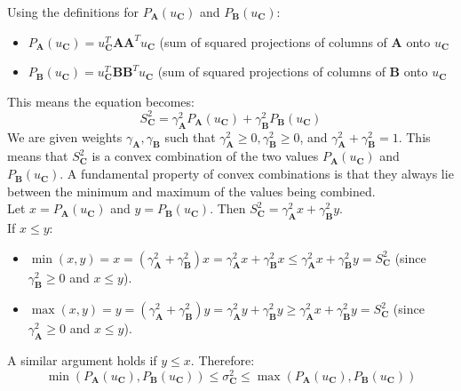 Using the definitions for $P_{\mathbf{A}}(u_{\mathbf{C}})$ and $P_{\mathbf{B}}(u_{\mathbf{C}})$:
\begin{itemize}
    \item $P_{\mathbf{A}}(u_{\mathbf{C}}) = u_{\mathbf{C}}^T\mathbf{A}\mathbf{A}^Tu_{\mathbf{C}}$ (sum of squared projections of columns of $\mathbf{A}$ onto $u_{\mathbf{C}}$
    \item $P_{\mathbf{B}}(u_{\mathbf{C}}) = u_{\mathbf{C}}^T\mathbf{B}\mathbf{B}^Tu_{\mathbf{C}}$ (sum of squared projections of columns of $\mathbf{B}$ onto $u_{\mathbf{C}}$
\end{itemize}
This means the equation becomes:
\[ S_{\mathbf{C}}^2 = \gamma_{\mathbf{A}}^2P_{\mathbf{A}}(u_{\mathbf{C}}) + \gamma_{\mathbf{B}}^2P_{\mathbf{B}}(u_{\mathbf{C}}) \]
We are given weights $\gamma_{\mathbf{A}}, \gamma_{\mathbf{B}}$ such that $\gamma_{\mathbf{A}}^2 \geq 0,
\gamma_{\mathbf{B}}^2 \geq 0$, and $\gamma_{\mathbf{A}}^2 + \gamma_{\mathbf{B}}^2 = 1$. This means that
$S_{\mathbf{C}}^2$ is a convex combination of the two values $P_{\mathbf{A}}(u_{\mathbf{C}})$ and
$P_{\mathbf{B}}(u_{\mathbf{C}})$.
A fundamental property of convex combinations is that they always lie between
the minimum and maximum of the values being combined.\\
Let $x = P_{\mathbf{A}}(u_{\mathbf{C}})$ and $y = P_{\mathbf{B}}(u_{\mathbf{C}})$. Then $S_{\mathbf{C}}^2 = \gamma_{\mathbf{A}}^2 x +
\gamma_{\mathbf{B}}^2 y$.\\
If $x \leq y$:
\begin{itemize}
    \item $\min(x,y) = x = (\gamma_{\mathbf{A}}^2 + \gamma_{\mathbf{B}}^2)x = \gamma_{\mathbf{A}}^2 x +
        \gamma_{\mathbf{B}}^2 x \leq \gamma_{\mathbf{A}}^2 x + \gamma_{\mathbf{B}}^2 y = S_{\mathbf{C}}^2$ (since
        $\gamma_{\mathbf{B}}^2 \geq 0$ and $x \leq y$).
    \item $\max(x,y) = y = (\gamma_{\mathbf{A}}^2 + \gamma_{\mathbf{B}}^2)y = \gamma_{\mathbf{A}}^2 y +
        \gamma_{\mathbf{B}}^2 y \geq \gamma_{\mathbf{A}}^2 x + \gamma_{\mathbf{B}}^2 y = S_{\mathbf{C}}^2$ (since
        $\gamma_{\mathbf{A}}^2 \geq 0$ and $x \leq y$).
\end{itemize}
A similar argument holds if $y \leq x$. Therefore:
\[ \min(P_{\mathbf{A}}(u_{\mathbf{\mathbf{C}}}),P_{\mathbf{\mathbf{B}}}(u_{\mathbf{\mathbf{C}}})) \leq \sigma_{\mathbf{\mathbf{C}}}^2 \leq
\max(P_{\mathbf{A}}(u_{\mathbf{\mathbf{C}}}),P_{\mathbf{\mathbf{B}}}(u_{\mathbf{\mathbf{C}}})) \]

